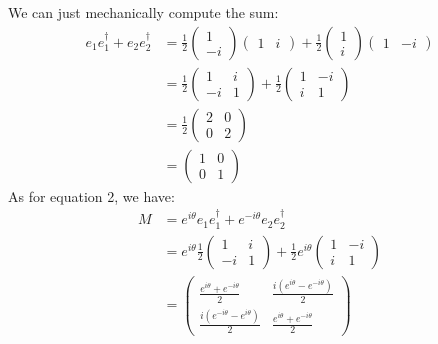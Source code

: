 \documentclass{article}
\begin{document}
\begin{solution}
	We can just mechanically compute the sum:
	\begin{align*}
		e_1e_1^\dagger + e_2e_2^\dagger &=\frac{1}{2} \begin{pmatrix}1 \\ -i \end{pmatrix}
		\begin{pmatrix} 1 & i \end{pmatrix} + \frac{1}{2}\begin{pmatrix} 1\\i \end{pmatrix} 
		\begin{pmatrix} 1 & -i \end{pmatrix} \\
						  &= \frac{1}{2}\begin{pmatrix} 1 & i \\ -i & 1 \end{pmatrix} + \frac{1}{2}
		\begin{pmatrix} 1 & -i \\ i & 1 \end{pmatrix}  \\
						  &= \frac{1}{2}\begin{pmatrix} 2 & 0 \\ 0 & 2 \end{pmatrix} \\
									   &= \begin{pmatrix} 1 & 0 \\ 0 & 1 \end{pmatrix}  
	\end{align*} 
	As for equation 2, we have:
	\begin{align*}
		M &= e^{i \theta} e_1 e_1^\dagger + e^{-i \theta} e_2e_2^\dagger \\
		  &= e^{i \theta} \frac{1}{2}\begin{pmatrix} 1&i \\ -i & 1 \end{pmatrix} + \frac{1}{2}e^{i \theta}
		\begin{pmatrix} 1 & -i\\ i & 1 \end{pmatrix} \\
						  &= \begin{pmatrix} \frac{e^{i \theta} + e^{- i \theta}}{2} & 
						  \frac{i(e^{i \theta} - e^{- i \theta})}{2}\\
					  \frac{i(e^{- i \theta} - e^{i \theta})}{2}& 
				  \frac{e^{i \theta} + e^{- i \theta}}{2}\end{pmatrix}

\end{align*}
\end{solution}
\end{document}
